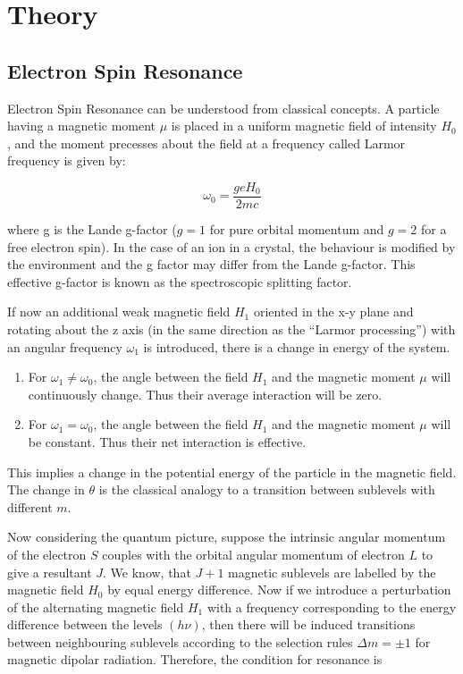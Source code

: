 \section{Theory}

	\subsection{Electron Spin Resonance}

		Electron Spin Resonance can be understood from classical concepts. A particle having a magnetic moment $\mu$ is placed in a uniform magnetic field of intensity $H_0$, and the moment precesses about the field at a frequency called Larmor frequency is given by:

		$$\omega_0 = \frac{geH_0}{2mc}$$

		where g is the Lande g-factor ($g=1$ for pure orbital momentum and $g=2$ for a free electron spin). In the case of an ion in a crystal, the behaviour is modified by the environment and the g factor may differ from the Lande g-factor. This effective g-factor is known as the spectroscopic splitting factor.
		
		If now an additional weak magnetic field $H_1$ oriented in the x-y plane and rotating about the z axis (in the same direction as the ``Larmor processing'') with an angular frequency $\omega_1$ is introduced, there is a change in energy of the system.

		\begin{enumerate}
			\item For $\omega_1 \neq \omega_0$, the angle between the field $H_1$ and the magnetic moment $\mu$ will continuously change. Thus their average interaction will be zero.
			\item For $\omega_1 = \omega_0$, the angle between the field $H_1$ and the magnetic moment $\mu$ will be constant. Thus their net interaction is effective.
		\end{enumerate}

		This implies a change in the potential energy of the particle in the magnetic field. The change in $\theta$ is the classical analogy to a transition between sublevels with different $m$.

		Now considering the quantum picture, suppose the intrinsic angular momentum of the electron $S$ couples with the orbital angular momentum of electron $L$ to give a resultant $J$. We know, that $J+1$ magnetic sublevels are labelled by the magnetic field $H_0$ by equal energy difference. Now if we introduce a perturbation of the alternating magnetic field $H_1$ with a frequency corresponding to the energy difference between the levels $(h\nu)$, then there will be induced transitions between neighbouring sublevels according to the selection rules $\Delta m = \pm 1$ for magnetic dipolar radiation. Therefore, the condition for resonance is

